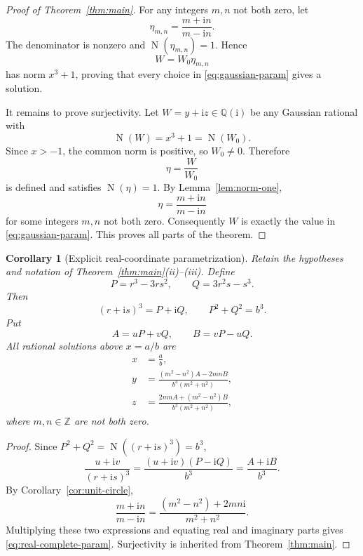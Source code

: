 \documentclass[11pt,a4paper]{article}
\numberwithin{equation}{section}
\newtheorem{corollary}[theorem]{Corollary}
\theoremstyle{definition}
\newcommand{\Q}{\mathbb{Q}}
\newcommand{\Z}{\mathbb{Z}}
\newcommand{\N}{\operatorname{N}}
\newcommand{\ii}{\mathrm{i}}
\begin{document}
\begin{proof}[Proof of Theorem~\ref{thm:main}]
For any integers $m,n$ not both zero, let
\[
 \eta_{m,n}=\frac{m+\ii n}{m-\ii n}.
\]
The denominator is nonzero and $\N(\eta_{m,n})=1$. Hence
\[
 W=W_0\eta_{m,n}
\]
has norm $x^3+1$, proving that every choice in \eqref{eq:gaussian-param} gives a solution.

It remains to prove surjectivity. Let $W=y+\ii z\in\Q(\ii)$ be any Gaussian rational with
\[
 \N(W)=x^3+1=\N(W_0).
\]
Since $x>-1$, the common norm is positive, so $W_0\ne0$. Therefore
\[
 \eta=\frac{W}{W_0}
\]
is defined and satisfies $\N(\eta)=1$. By Lemma~\ref{lem:norm-one},
\[
 \eta=\frac{m+\ii n}{m-\ii n}
\]
for some integers $m,n$ not both zero. Consequently $W$ is exactly the value in \eqref{eq:gaussian-param}. This proves all parts of the theorem.
\end{proof}

\begin{corollary}[Explicit real-coordinate parametrization]
\label{cor:real-param}
Retain the hypotheses and notation of Theorem~\ref{thm:main}(ii)--(iii). Define
\begin{equation}
 P=r^3-3rs^2,
 \qquad
 Q=3r^2s-s^3.
 \label{eq:PQ}
\end{equation}
Then
\[
 (r+\ii s)^3=P+\ii Q,
 \qquad
 P^2+Q^2=b^3.
\]
Put
\begin{equation}
 A=uP+vQ,
 \qquad
 B=vP-uQ.
 \label{eq:AB-base}
\end{equation}
All rational solutions above $x=a/b$ are
\begin{equation}
 \boxed{
 \begin{aligned}
 x&=\frac ab,\\[2mm]
 y&=\frac{(m^2-n^2)A-2mnB}{b^3(m^2+n^2)},\\[2mm]
 z&=\frac{2mnA+(m^2-n^2)B}{b^3(m^2+n^2)},
 \end{aligned}}
 \label{eq:real-complete-param}
\end{equation}
where $m,n\in\Z$ are not both zero.
\end{corollary}

\begin{proof}
Since $P^2+Q^2=\N((r+\ii s)^3)=b^3$,
\[
 \frac{u+\ii v}{(r+\ii s)^3}
 =\frac{(u+\ii v)(P-\ii Q)}{b^3}
 =\frac{A+\ii B}{b^3}.
\]
By Corollary~\ref{cor:unit-circle},
\[
 \frac{m+\ii n}{m-\ii n}
 =\frac{(m^2-n^2)+2mn\ii}{m^2+n^2}.
\]
Multiplying these two expressions and equating real and imaginary parts gives \eqref{eq:real-complete-param}. Surjectivity is inherited from Theorem~\ref{thm:main}.
\end{proof}
\end{document}
